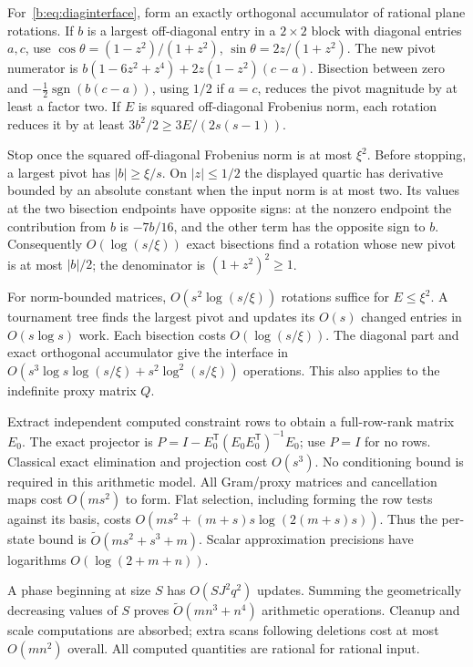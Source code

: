 \documentclass[11pt]{amsart}
\theoremstyle{definition}\newtheorem{definition}[theorem]{Definition}
\theoremstyle{remark}\newtheorem{remark}[theorem]{Remark}
\numberwithin{equation}{section}
\newcommand{\T}{\mathsf T}
\begin{document}
For~\eqref{b:eq:diaginterface}, form an exactly orthogonal accumulator of
rational plane rotations. If $b$ is a largest off-diagonal entry in a
$2\times2$ block with diagonal entries $a,c$, use
$\cos\theta=(1-z^2)/(1+z^2)$, $\sin\theta=2z/(1+z^2)$.
The new pivot numerator is
$b(1-6z^2+z^4)+2z(1-z^2)(c-a)$.
Bisection between zero and
$-\tfrac12\operatorname{sgn}(b(c-a))$, using $1/2$ if $a=c$,
reduces the pivot magnitude by at least a factor two.
If $E$ is squared off-diagonal Frobenius norm, each rotation reduces it by
at least $3b^2/2\ge3E/(2s(s-1))$.

Stop once the squared off-diagonal Frobenius norm is at most $\xi^2$.
Before stopping, a largest pivot has $|b|\ge\xi/s$. On $|z|\le1/2$
the displayed quartic has derivative bounded by an absolute constant
when the input norm is at most two. Its values at the two bisection
endpoints have opposite signs: at the nonzero endpoint the contribution
from $b$ is $-7b/16$, and the other term has the opposite sign to $b$.
Consequently $O(\log(s/\xi))$ exact bisections find a rotation whose
new pivot is at most $|b|/2$; the denominator is $(1+z^2)^2\ge1$.

For norm-bounded matrices, $O(s^2\log(s/\xi))$ rotations suffice for
$E\le\xi^2$. A tournament tree finds the largest pivot and updates its
$O(s)$ changed entries in $O(s\log s)$ work. Each bisection costs
$O(\log(s/\xi))$. The diagonal part and exact orthogonal accumulator give
the interface in
$O(s^3\log s\log(s/\xi)+s^2\log^2(s/\xi))$ operations.
This also applies to the indefinite proxy matrix $Q$.

Extract independent computed constraint rows to obtain a full-row-rank
matrix $E_0$. The exact projector is
$P=I-E_0^\T(E_0E_0^\T)^{-1}E_0$; use $P=I$ for no rows.
Classical exact elimination and projection cost $O(s^3)$.
No conditioning bound is required in this arithmetic model.
All Gram/proxy matrices and cancellation maps cost $O(ms^2)$ to form.
Flat selection, including forming the row tests against its basis, costs
$O(ms^2+(m+s)s\log(2(m+s)s))$.
Thus the per-state bound is $\widetilde O(ms^2+s^3+m)$.
Scalar approximation precisions have logarithms $O(\log(2+m+n))$.

A phase beginning at size $S$ has $O(SJ^2q^2)$ updates.
Summing the geometrically decreasing values of $S$ proves
$\widetilde O(mn^3+n^4)$ arithmetic operations. Cleanup and scale
computations are absorbed; extra scans following deletions cost at most
$O(mn^2)$ overall. All computed quantities are rational for rational input.
\end{document}
